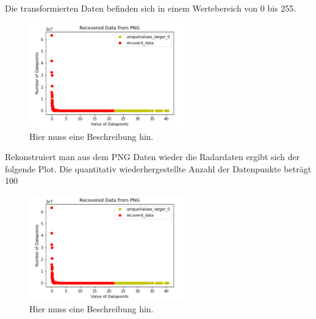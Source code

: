 Die transformierten Daten befinden sich in einem Wertebereich von 0 bis 255.  

\begin{figure}[h]
 \centering
 \includegraphics[width=0.6\textwidth,angle=0]{abb/datenaufbereitung_beispiel}
 \caption[Datenaufbereitung]{Hier muss eine Beschreibung hin.}
\label{fig:datenaufbereitung}
\end{figure}

Rekonstruiert man aus dem PNG Daten wieder die Radardaten ergibt sich der folgende Plot. Die quantitativ wiederhergestellte Anzahl der Datenpunkte beträgt 100%

\begin{figure}[h]
 \centering
 \includegraphics[width=0.6\textwidth,angle=0]{abb/datenaufbereitung_beispiel}
 \caption[Datenaufbereitung]{Hier muss eine Beschreibung hin.}
\label{fig:datenaufbereitung}
\end{figure}